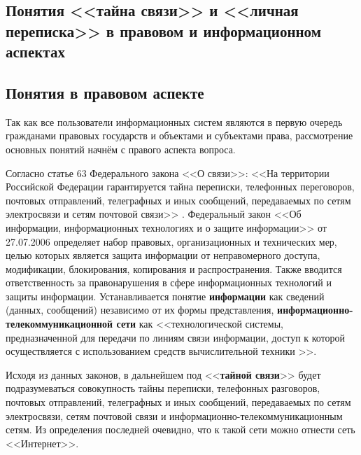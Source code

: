 \parindent=1cm %
\begin{center}
		
		\section{Понятия <<тайна связи>> и <<личная переписка>> в правовом  и информационном аспектах}
		
\end{center}
\subsection{Понятия в правовом аспекте} 

Так как все пользователи информационных систем являются в первую очередь гражданами правовых государств и объектами и субъектами права, рассмотрение основных понятий начнём с правого аспекта вопроса.

Согласно статье 63 Федерального закона <<О связи>>\cite{63FZ}: %
<<На территории Российской Федерации гарантируется тайна переписки, телефонных переговоров, почтовых отправлений, телеграфных и иных сообщений, передаваемых по сетям электросвязи и сетям почтовой связи>> .
Федеральный закон <<Об информации, информационных технологиях и о защите информации>> от 27.07.2006  \cite{149FZ}
определяет набор правовых, организационных и технических мер,  целью которых является  защита информации от неправомерного доступа, модификации, блокирования, копирования и распространения. Также вводится ответственность за правонарушения в сфере информационных технологий и защиты информации.  Устанавливается понятие \textbf{информации} как сведений (данных, сообщений) независимо от их формы представления, \textbf{информационно-телекоммуникационной сети } как <<технологической системы, предназначенной для передачи по линиям связи информации, доступ к которой осуществляется с использованием средств вычислительной техники >>. 

Исходя из данных законов, в дальнейшем под <<\textbf{тайной связи}>>  будет подразумеваться совокупность тайны переписки, телефонных разговоров, почтовых отправлений, телеграфных и иных сообщений, передаваемых по сетям электросвязи, сетям почтовой связи и информационно-телекоммуникационным сетям.  Из определения последней очевидно, что к такой сети  можно отнести сеть <<Интернет>>.


